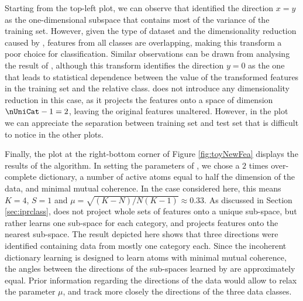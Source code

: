 \documentclass{article}
\def \nDim{N} 			%
\def \nAto{K} 			%
\def \coherence{\mu} 		%
\def \nActiveAtoms{S} 	%
\begin{document}
Starting from the top-left plot, we can observe that  identified the direction $x=y$ as the one-dimensional subspace that contains most of the variance of the training set. However, given the type of dataset and the dimensionality reduction caused by , features from all classes are overlapping, making this transform a poor choice for classification. Similar observations can be drawn from analysing the result of , although this transform identifies the direction $y=0$ as the one that leads to statistical dependence between the value of the transformed features in the training set and the relative class.  does not introduce any dimensionality reduction in this case, as it projects the features onto a space of dimension $\nUniCat-1=2$, leaving the original features unaltered. However, in the  plot we can appreciate the separation between training set and test set that is difficult to notice in the other plots. 

Finally, the plot at the right-bottom corner of Figure \ref{fig:toyNewFea} displays the results of the  algorithm. In setting the parameters of , we chose a $2$ times over-complete dictionary, a number of active atoms equal to half the dimension of the data, and minimal mutual coherence. In the case considered here, this means $\nAto = 4$, $\nActiveAtoms = 1$ and $\coherence = \sqrt{(\nAto-\nDim)/\nDim(\nAto-1)} \approx 0.33$. As discussed in Section \ref{sec:iprclass},  does not project whole sets of features onto a unique sub-space, but rather learns one sub-space for each category, and projects features onto the nearest sub-space. The result depicted here shows that three directions were identified containing data from mostly one category each. Since the incoherent dictionary learning is designed to learn atoms with minimal mutual coherence, the angles between the directions of the sub-spaces learned by  are approximately equal. Prior information regarding the directions of the data would allow to relax the parameter $\coherence$, and track more closely the directions of the three data classes.
\end{document}
